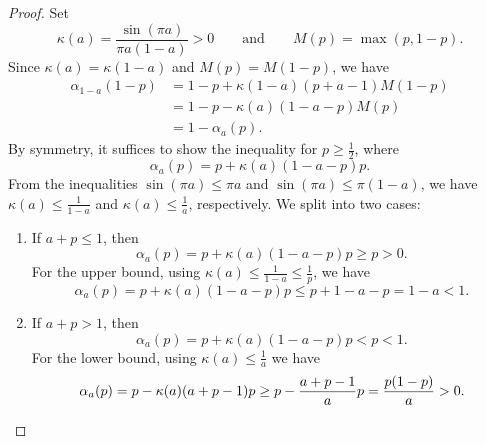 \documentclass[11pt]{article}
\theoremstyle{plain}
\theoremstyle{remark}
\begin{document}
\begin{proof}
Set
\[
  \kappa(a) = \frac{\sin(\pi a)}{\pi a(1-a)}>0
  \qquad\text{and}\qquad
  M(p) = \max(p,1-p).
\]
Since $\kappa(a)=\kappa(1-a)$ and $M(p)=M(1-p)$, we have
\[
  \begin{aligned}
    \alpha_{1-a}(1-p)
      &= 1-p + \kappa(1-a)(p+a-1)M(1-p) \\
      &= 1-p-\kappa(a)(1-a-p)M(p) \\
      &= 1-\alpha_a(p).
  \end{aligned}
\]
By symmetry, it suffices to show the inequality for $p \geq \frac{1}{2}$, where
\[
  \alpha_a(p) = p + \kappa(a)(1-a-p)p.
\]
From the inequalities $\sin(\pi a) \leq \pi a$ and $\sin(\pi a) \leq \pi (1 - a)$, we have $\kappa(a)\leq \frac{1}{1-a}$ and $\kappa(a) \leq \frac{1}{a}$, respectively.
We split into two cases:
\begin{enumerate}
\item If $a + p \leq 1$, then
\[
  \alpha_a(p) = p + \kappa(a)(1-a-p)p\geq p > 0.
\]
For the upper bound, using $\kappa(a) \leq \frac{1}{1-a}\leq\frac{1}{p}$, we have
\[
  \alpha_a(p) = p + \kappa(a)(1-a-p)p \leq p + 1 - a-p =1-a< 1.
\]
\item If $a + p > 1$, then
\[
  \alpha_a(p) = p + \kappa(a)(1-a-p)p < p < 1.
\]
For the lower bound, using $\kappa(a) \leq \frac{1}{a}$ we have
\[
  \alpha_a(p) = p - \kappa(a)(a+p-1)p \geq p-\frac{a+p-1}{a}p =\frac{p(1-p)}{a} > 0.\qedhere
\]

\end{enumerate}
\end{proof}
\end{document}
